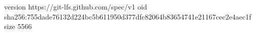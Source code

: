 version https://git-lfs.github.com/spec/v1
oid sha256:755dade76132d224bc5b611950d377dfc82064b83654741e21167cec2e4aec1f
size 5566
